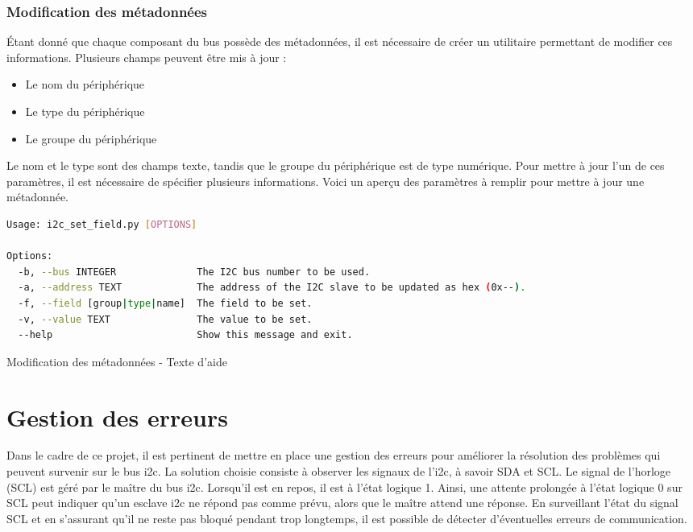 \subsubsection{Modification des métadonnées}

Étant donné que chaque composant du bus possède des métadonnées, il est nécessaire de créer un utilitaire permettant de modifier ces informations.
Plusieurs champs peuvent être mis à jour :

\begin{itemize}
    \item Le nom du périphérique
    \item Le type du périphérique
    \item Le groupe du périphérique
\end{itemize}

Le nom et le type sont des champs texte, tandis que le groupe du périphérique est de type numérique.
Pour mettre à jour l'un de ces paramètres, il est nécessaire de spécifier plusieurs informations.
Voici un aperçu des paramètres à remplir pour mettre à jour une métadonnée.

\begin{listing}[!h]
    \begin{lstlisting}[language=bash]
Usage: i2c_set_field.py [OPTIONS]

Options:
  -b, --bus INTEGER              The I2C bus number to be used.
  -a, --address TEXT             The address of the I2C slave to be updated as hex (0x--).
  -f, --field [group|type|name]  The field to be set.
  -v, --value TEXT               The value to be set.
  --help                         Show this message and exit.
    \end{lstlisting}
    \caption{Modification des métadonnées - Texte d'aide}
\end{listing}

\section{Gestion des erreurs}

Dans le cadre de ce projet, il est pertinent de mettre en place une gestion des erreurs pour améliorer la résolution des problèmes qui peuvent survenir sur le bus \gls{i2c}.
La solution choisie consiste à observer les signaux de l'\gls{i2c}, à savoir SDA et SCL.
Le signal de l'horloge (SCL) est géré par le maître du bus \gls{i2c}. Lorsqu'il est en repos, il est à l'état logique 1.
Ainsi, une attente prolongée à l'état logique 0 sur SCL peut indiquer qu'un esclave \gls{i2c} ne répond pas comme prévu, alors que le maître attend une réponse.
En surveillant l'état du signal SCL et en s'assurant qu'il ne reste pas bloqué pendant trop longtemps, il est possible de détecter d'éventuelles erreurs de communication.

